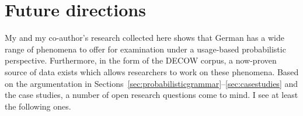 \section{Future directions}
\label{sec:futuredirections}

My and my co-author's research collected here shows that German has a wide range of phenomena to offer for examination under a usage-based probabilistic perspective.
Furthermore, in the form of the DECOW corpus, a now-proven source of data exists which allows researchers to work on these phenomena.
Based on the argumentation in Sections~\ref{sec:probabilisticgrammar}--\ref{sec:casestudies} and the case studies, a number of open research questions come to mind.
I see at least the following ones.

\vspace{\baselineskip}

